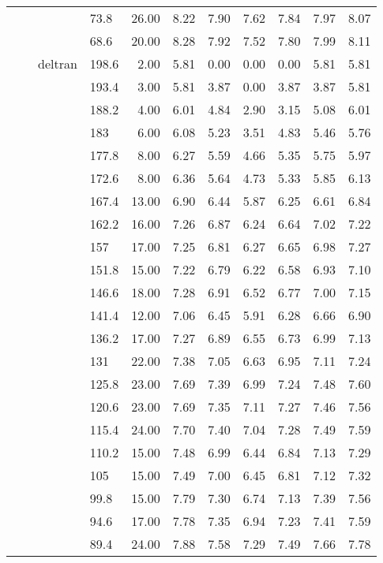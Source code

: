 \begin{longtable}{llllrrrrrrr}
   &  &  & 73.8 & 26.00 & 8.22 & 7.90 & 7.62 & 7.84 & 7.97 & 8.07 \\ 
   &  &  & 68.6 & 20.00 & 8.28 & 7.92 & 7.52 & 7.80 & 7.99 & 8.11 \\ 
   &  & deltran & 198.6 & 2.00 & 5.81 & 0.00 & 0.00 & 0.00 & 5.81 & 5.81 \\ 
   &  &  & 193.4 & 3.00 & 5.81 & 3.87 & 0.00 & 3.87 & 3.87 & 5.81 \\ 
   &  &  & 188.2 & 4.00 & 6.01 & 4.84 & 2.90 & 3.15 & 5.08 & 6.01 \\ 
   &  &  & 183 & 6.00 & 6.08 & 5.23 & 3.51 & 4.83 & 5.46 & 5.76 \\ 
   &  &  & 177.8 & 8.00 & 6.27 & 5.59 & 4.66 & 5.35 & 5.75 & 5.97 \\ 
   &  &  & 172.6 & 8.00 & 6.36 & 5.64 & 4.73 & 5.33 & 5.85 & 6.13 \\ 
   &  &  & 167.4 & 13.00 & 6.90 & 6.44 & 5.87 & 6.25 & 6.61 & 6.84 \\ 
   &  &  & 162.2 & 16.00 & 7.26 & 6.87 & 6.24 & 6.64 & 7.02 & 7.22 \\ 
   &  &  & 157 & 17.00 & 7.25 & 6.81 & 6.27 & 6.65 & 6.98 & 7.27 \\ 
   &  &  & 151.8 & 15.00 & 7.22 & 6.79 & 6.22 & 6.58 & 6.93 & 7.10 \\ 
   &  &  & 146.6 & 18.00 & 7.28 & 6.91 & 6.52 & 6.77 & 7.00 & 7.15 \\ 
   &  &  & 141.4 & 12.00 & 7.06 & 6.45 & 5.91 & 6.28 & 6.66 & 6.90 \\ 
   &  &  & 136.2 & 17.00 & 7.27 & 6.89 & 6.55 & 6.73 & 6.99 & 7.13 \\ 
   &  &  & 131 & 22.00 & 7.38 & 7.05 & 6.63 & 6.95 & 7.11 & 7.24 \\ 
   &  &  & 125.8 & 23.00 & 7.69 & 7.39 & 6.99 & 7.24 & 7.48 & 7.60 \\ 
   &  &  & 120.6 & 23.00 & 7.69 & 7.35 & 7.11 & 7.27 & 7.46 & 7.56 \\ 
   &  &  & 115.4 & 24.00 & 7.70 & 7.40 & 7.04 & 7.28 & 7.49 & 7.59 \\ 
   &  &  & 110.2 & 15.00 & 7.48 & 6.99 & 6.44 & 6.84 & 7.13 & 7.29 \\ 
   &  &  & 105 & 15.00 & 7.49 & 7.00 & 6.45 & 6.81 & 7.12 & 7.32 \\ 
   &  &  & 99.8 & 15.00 & 7.79 & 7.30 & 6.74 & 7.13 & 7.39 & 7.56 \\ 
   &  &  & 94.6 & 17.00 & 7.78 & 7.35 & 6.94 & 7.23 & 7.41 & 7.59 \\ 
   &  &  & 89.4 & 24.00 & 7.88 & 7.58 & 7.29 & 7.49 & 7.66 & 7.78 \\ 

\end{longtable}
